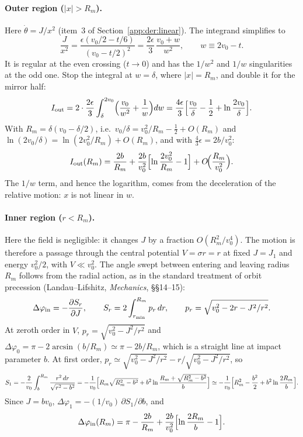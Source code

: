 \paragraph{Outer region ($|x|>R_m$).} Here $\dot\theta=J/x^2$ (item~3 of Section~\ref{app:der:linear}). The integrand
simplifies to
\begin{equation}
  \frac{J}{x^2}=\frac{\epsilon(v_0/2-t/6)}{(v_0-t/2)^2}=\frac{2\epsilon}{3}\,\frac{v_0+w}{w^2},\qquad w\equiv2v_0-t .
\end{equation}
It is regular at the even crossing ($t\to0$) and has the $1/w^2$ and $1/w$ singularities at the odd one. Stop the
integral at $w=\delta$, where $|x|=R_m$, and double it for the mirror half:
\begin{equation}
  I_{\rm out}=2\cdot\frac{2\epsilon}{3}\int_\delta^{2v_0}\Bigl(\frac{v_0}{w^2}+\frac1w\Bigr)dw
  =\frac{4\epsilon}{3}\Bigl[\frac{v_0}{\delta}-\frac12+\ln\frac{2v_0}{\delta}\Bigr].
\end{equation}
With $R_m=\delta(v_0-\delta/2)$, i.e.\ $v_0/\delta=v_0^2/R_m-\tfrac12+O(R_m)$ and $\ln(2v_0/\delta)=\ln(2v_0^2/R_m)+O(R_m)$, and
with $\tfrac43\epsilon=2b/v_0^2$:
\begin{equation}
  I_{\rm out}(R_m)=\frac{2b}{R_m}+\frac{2b}{v_0^2}\Bigl[\ln\frac{2v_0^2}{R_m}-1\Bigr]+O\!\Bigl(\frac{R_m}{v_0^2}\Bigr).
  \label{eq:D:Iout}
\end{equation}
The $1/w$ term, and hence the logarithm, comes from the deceleration of the relative motion: $x$ is not linear in $w$.

\paragraph{Inner region ($r<R_m$).} Here the field is negligible: it changes $J$ by a fraction $O(R_m^2/v_0^4)$. The
motion is therefore a passage through the central potential $V=\sigma r=r$ at fixed $J=J_1$ and energy $v_0^2/2$, with
$V\ll v_0^2$. The angle swept between entering and leaving radius $R_m$ follows from the radial action, as in the
standard treatment of orbit precession (Landau--Lifshitz, \emph{Mechanics}, \S\S14--15):
\begin{equation}
  \Delta\varphi_{\rm in}=-\frac{\partial S_r}{\partial J},\qquad
  S_r=2\int_{r_{\min}}^{R_m}p_r\,dr,\qquad p_r=\sqrt{v_0^2-2r-J^2/r^2}.
\end{equation}
At zeroth order in $V$, $p_r=\sqrt{v_0^2-J^2/r^2}$ and $\Delta\varphi_0=\pi-2\arcsin(b/R_m)\simeq\pi-2b/R_m$, which is a
straight line at impact parameter $b$. At first order, $p_r\simeq\sqrt{v_0^2-J^2/r^2}-r/\sqrt{v_0^2-J^2/r^2}$, so
\begin{equation}
  S_1=-\frac{2}{v_0}\int_b^{R_m}\frac{r^2\,dr}{\sqrt{r^2-b^2}}
     =-\frac{1}{v_0}\Bigl[R_m\sqrt{R_m^2-b^2}+b^2\ln\frac{R_m+\sqrt{R_m^2-b^2}}{b}\Bigr]
     \simeq-\frac{1}{v_0}\Bigl[R_m^2-\frac{b^2}{2}+b^2\ln\frac{2R_m}{b}\Bigr].
\end{equation}
Since $J=bv_0$, $\Delta\varphi_1=-(1/v_0)\,\partial S_1/\partial b$, and
\begin{equation}
  \Delta\varphi_{\rm in}(R_m)=\pi-\frac{2b}{R_m}+\frac{2b}{v_0^2}\Bigl[\ln\frac{2R_m}{b}-1\Bigr].
  \label{eq:D:inner}
\end{equation}

